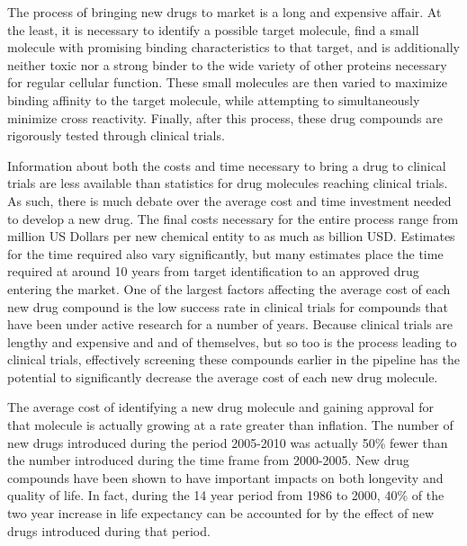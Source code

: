 The process of bringing new drugs to market is a long and expensive affair.
At the least, it is necessary to identify a possible target molecule, find a small molecule with promising binding characteristics to that target, and is additionally neither toxic nor a strong binder to the wide variety of other proteins necessary for regular cellular function.
These small molecules are then varied to maximize binding affinity to the target molecule, while attempting to simultaneously minimize cross reactivity.
Finally, after this process, these drug compounds are rigorously tested through clinical trials.

Information about both the costs and time necessary to bring a drug to clinical trials are less available than statistics for drug molecules reaching clinical trials.
As such, there is much debate over the average cost and time investment needed to develop a new drug.
The final costs necessary for the entire process range from  million US Dollars per new chemical entity to as much as  billion USD.
Estimates for the time required also vary significantly, but many estimates place the time required at around 10 years from target identification to an approved drug entering the market.
One of the largest factors affecting the average cost of each new drug compound is the low success rate in clinical trials for compounds that have been under active research for a number of years.
Because clinical trials are lengthy and expensive and and of themselves, but so too is the process leading to clinical trials, effectively screening these compounds earlier in the pipeline has the potential to significantly decrease the average cost of each new drug molecule.
\cite{adams2006estimating}


The average cost of identifying a new drug molecule and gaining approval for that molecule is actually growing at a rate greater than inflation.
The number of new drugs introduced during the period 2005-2010 was actually 50\% fewer than the number introduced during the time frame from 2000-2005.
New drug compounds have been shown to have important impacts on both longevity and quality of life.
In fact, during the 14 year period from 1986 to 2000, 40\% of the two year increase in life expectancy can be accounted for by the effect of new drugs introduced during that period.
\cite{paul2010improve}


